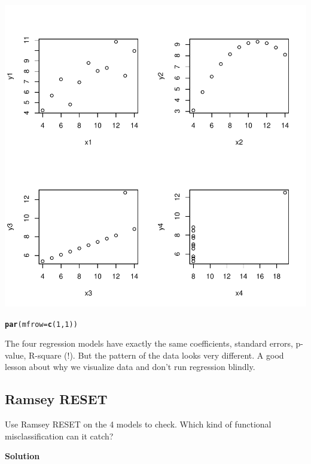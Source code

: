 \documentclass{article}\usepackage[]{graphicx}\usepackage[]{color}
\makeatletter
\def\maxwidth{ %
  \ifdim\Gin@nat@width>\linewidth
    \linewidth
  \else
    \Gin@nat@width
  \fi
}
\newcommand{\hlnum}[1]{\textcolor[rgb]{0.686,0.059,0.569}{#1}}%
\newcommand{\hlstd}[1]{\textcolor[rgb]{0.345,0.345,0.345}{#1}}%
\newcommand{\hlkwc}[1]{\textcolor[rgb]{0.333,0.667,0.333}{#1}}%
\newcommand{\hlkwd}[1]{\textcolor[rgb]{0.737,0.353,0.396}{\textbf{#1}}}%
\newenvironment{kframe}{%
 \def\at@end@of@kframe{}%
 \ifinner\ifhmode%
  \def\at@end@of@kframe{\end{minipage}}%
  \begin{minipage}{\columnwidth}%
 \fi\fi%
 \def\FrameCommand##1{\hskip\@totalleftmargin \hskip-\fboxsep
 \colorbox{shadecolor}{##1}\hskip-\fboxsep
     \hskip-\linewidth \hskip-\@totalleftmargin \hskip\columnwidth}%
 \MakeFramed {\advance\hsize-\width
   \@totalleftmargin\z@ \linewidth\hsize
   \@setminipage}}%
 {\par\unskip\endMakeFramed%
 \at@end@of@kframe}
\newenvironment{knitrout}{}{} %
\makeatother
\begin{document}
\begin{knitrout}
\includegraphics[width=\maxwidth]{figure/unnamed-chunk-2-1} 
\begin{kframe}\begin{alltt}
\hlkwd{par}\hlstd{(}\hlkwc{mfrow}\hlstd{=}\hlkwd{c}\hlstd{(}\hlnum{1}\hlstd{,}\hlnum{1}\hlstd{))}
\end{alltt}
\end{kframe}
\end{knitrout}

The four regression models have exactly the same coefficients, standard errors, p-value, R-square (!). But the pattern of the data looks very different. A good lesson about why we visualize data and don't run regression blindly.

\subsection{Ramsey RESET}

Use Ramsey RESET on the 4 models to check. Which kind of functional misclassification can it catch?

\textbf{Solution}
\end{document}
